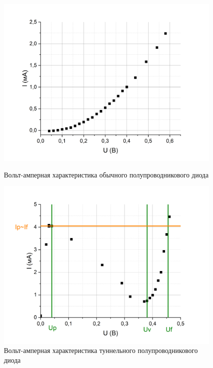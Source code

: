 \documentclass[a4paper,12pt]{article} %
\begin{document}
\begin{figure}[h!]
    

\begin{minipage}{0.5\textwidth}
  \includegraphics[width= \linewidth]{ordinary.png}
  \caption{Вольт-амперная характеристика обычного полупроводникового диода}
  \label{fig:mirrored_polarization_degree_by_theta}

\end{minipage}
\hfill%
\begin{minipage}{0.5\textwidth}
 
  \includegraphics[width= \linewidth]{tunnel.png}
  \caption{Вольт-амперная характеристика туннельного полупроводникового диода}
  \label{fig:duffuse_polarization_degree_by_theta}

\end{minipage}
\end{figure}
\end{document}
